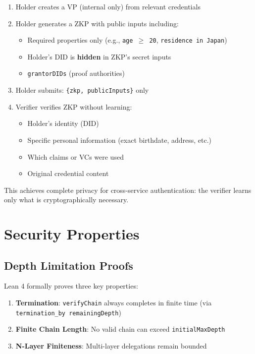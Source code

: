\begin{enumerate}
  \item Holder creates a VP (internal only) from relevant credentials
  \item Holder generates a ZKP with public inputs including:
    \begin{itemize}
      \item Required properties only (e.g., \texttt{age $\geq$ 20}, \texttt{residence in Japan})
      \item Holder's DID is \textbf{hidden} in ZKP's secret inputs
      \item \texttt{grantorDIDs} (proof authorities)
    \end{itemize}
  \item Holder submits: \texttt{\{zkp, publicInputs\}} only
  \item Verifier verifies ZKP without learning:
    \begin{itemize}
      \item Holder's identity (DID)
      \item Specific personal information (exact birthdate, address, etc.)
      \item Which claims or VCs were used
      \item Original credential content
    \end{itemize}
\end{enumerate}

This achieves complete privacy for cross-service authentication: the verifier learns only what is cryptographically necessary.

\section{Security Properties}

\subsection{Depth Limitation Proofs}

Lean 4 formally proves three key properties:

\begin{enumerate}
  \item \textbf{Termination}: \texttt{verifyChain} always completes in finite time (via \texttt{termination\_by remainingDepth})
  \item \textbf{Finite Chain Length}: No valid chain can exceed \texttt{initialMaxDepth}
  \item \textbf{N-Layer Finiteness}: Multi-layer delegations remain bounded
\end{enumerate}

